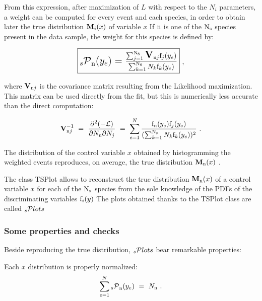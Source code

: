 \documentclass[11pt]{article}
\begin{document}
From this expression, after maximization of $L$ with respect to the $N_i$ parameters, a weight can be computed for every event and each species, in order to obtain later the true distribution  ${\hbox{\bf {M}}}_i(x)$ of variable $x$  If ${\rm n}$ is one of the 
 ${\rm N}_{\rm s}$ species present in the data sample, the weight for this species is defined by:



 \begin{equation}
\begin{Large}\fbox{$
{_s{\cal P}}_{\rm n}(y_e)={\sum_{j=1}^{{\rm N}_{\rm s}} \hbox{\bf V}_{{\rm n}j}{\rm f}_j(y_e)\over\sum_{k=1}^{{\rm N}_{\rm s}}N_k{\rm f}_k(y_e) } $}\end{Large} ~,
\end{equation}
 

where $\hbox{\bf V}_{{\rm n}j}$ is the covariance matrix resulting from the Likelihood maximization.
This matrix can be used directly from the fit, but this is numerically
less accurate than the direct computation:

 \begin{equation}
\hbox{\bf V}^{-1}_{{\rm n}j}~=~
{\partial^2(-{\cal L})\over\partial N_{\rm n}\partial N_j}~=~
\sum_{e=1}^N {{\rm f}_{\rm n}(y_e){\rm f}_j(y_e)\over(\sum_{k=1}^{{\rm N}_{\rm s}}N_k{\rm f}_k(y_e))^2} ~.
\end{equation}


The distribution of the control variable $x$ obtained by histogramming the weighted events reproduces, on average, the true distribution ${\hbox{\bf {M}}}_{\rm n}(x)$ .



The class TSPlot allows to reconstruct the true distribution 
${\hbox{\bf {M}}}_{\rm n}(x)$ of a control variable $x$ for each of the 
${\rm N}_{\rm s}$ species from the sole knowledge of the PDFs of the discriminating variables ${\rm f}_i(y)$  The plots obtained thanks to the TSPlot class are called 
 $\hbox{$_s$}{\cal P}lots$
 


\subsubsection{Some properties and checks}




Beside reproducing the true distribution, 
$\hbox {$_s$}{\cal P}lots$ bear remarkable properties:


Each $x$ distribution is properly normalized:
 \begin{equation}
\sum_{e=1}^{N} {_s{\cal P}}_{\rm n}(y_e)~=~N_{\rm n}~.
\end{equation}
 
\end{document}
